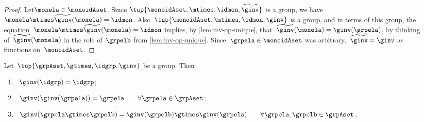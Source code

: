 \begin{proof}
Let$\monela \in \monoidAset$.
Since $\tup{\monoidAset, \mtimes,  \idmon, \widetilde \ginv }$ is a group, we have~$\monela \mtimes  \widetilde \ginv(\monela) = \idmon$.
Also~$\tup{\monoidAset, \mtimes,  \idmon, \ginv }$ is a group, and in terms of this group, the equation~$\monela \mtimes  \widetilde \ginv(\monela) = \idmon$ implies, by \cref{lem:inv-op-unique}, that~$\widetilde \ginv(\monela) = \ginv(\grpela)$, by thinking of~$\widetilde \ginv(\monela)$ in the role of~$\grpelb$ from \cref{lem:inv-op-unique}.
Since~$\grpela \in \monoidAset$ was arbitrary,~$\widetilde \ginv = \ginv$ as functions on~$\monoidAset$.
\end{proof}


\begin{lemma}
  \label{lem:inv-op-properties}
  Let~$\tup{\grpAset, \gtimes, \idgrp, \ginv}$ be a group. Then
  \begin{enumerate}
    \item\label{eq:group-neutral-invariant}~$\ginv(\idgrp) = \idgrp$;
    \item\label{eq:group-inverse-inverse}~$ \ginv(\ginv(\grpela)) = \grpela \qquad \forall \grpela \in \grpAset$;
    \item\label{eq:group-inverse-of-composition}~$\ginv(\grpela \gtimes \grpelb ) = \ginv(\grpelb) \gtimes \ginv(\grpela) \qquad \forall \grpela, \grpelb \in \grpAset$.
  \end{enumerate}
\end{lemma}

